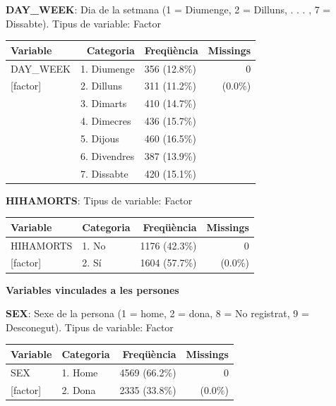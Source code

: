 \documentclass[11pt,longbibliography]{article}
\theoremstyle{definition}
\theoremstyle{remark}
\begin{document}
\textbf{DAY\_WEEK}: Dia de la setmana (1 = Diumenge, 2 = Dilluns, . . . , 7 = Dissabte). Tipus de variable: Factor



\begin{table}[H]
\centering
\begin{tabular}{llll}
\hline
Variable & \multicolumn{1}{r}{Categoria} & \multicolumn{1}{r}{Freqüència} & \multicolumn{1}{r}{Missings} \\ \hline
DAY\_WEEK    & 1. Diumenge  & 356 (12.8\%) & \multicolumn{1}{r}{0} \\
{[}factor{]} & 2. Dilluns   & 311 (11.2\%) & \multicolumn{1}{r}{(0.0\%)}          \\
             & 3. Dimarts   & 410 (14.7\%) & \multicolumn{1}{r}{}          \\
             & 4. Dimecres  & 436 (15.7\%) &                               \\
             & 5. Dijous    & 460 (16.5\%) &                               \\
             & 6. Divendres & 387 (13.9\%) &                               \\
             & 7. Dissabte  & 420 (15.1\%) &                              \\ \hline
\end{tabular}
\end{table}



\textbf{HIHAMORTS}:  Tipus de variable: Factor


\begin{table}[H]
\centering
\begin{tabular}{llll}
\hline
Variable & \multicolumn{1}{r}{Categoria} & \multicolumn{1}{r}{Freqüència} & \multicolumn{1}{r}{Missings} \\ \hline
HIHAMORTS    & 1. No  & 1176 (42.3\%) & \multicolumn{1}{r}{0} \\
{[}factor{]} & 2. Sí   & 1604 (57.7\%) & \multicolumn{1}{r}{(0.0\%)}          \\\hline
\end{tabular}
\end{table}


\textbf{Variables vinculades a les persones}


\textbf{SEX}: Sexe de la persona (1 = home, 2 = dona, 8 = No registrat, 9 = Desconegut). Tipus de variable: Factor


\begin{table}[H]
\centering
\begin{tabular}{llll}
\hline
Variable & \multicolumn{1}{r}{Categoria} & \multicolumn{1}{r}{Freqüència} & \multicolumn{1}{r}{Missings} \\ \hline
SEX    & 1. Home  & 4569 (66.2\%) & \multicolumn{1}{r}{0} \\
{[}factor{]} & 2. Dona   & 2335 (33.8\%) & \multicolumn{1}{r}{(0.0\%)}          \\\hline
\end{tabular}
\end{table}
\end{document}

